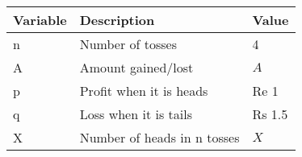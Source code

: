 \begin{tabular}{|l|l|l|}\hline
Variable	&Description	&Value\\\hline
n	&Number of tosses	&4\\\hline
A	&Amount gained/lost	&$A$\\\hline
p	&Profit when it is heads	&Re 1\\\hline
q	&Loss when it is tails		&Rs 1.5\\\hline
X	&Number of heads in n tosses	&$X$\\\hline
\end{tabular}
